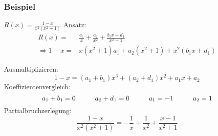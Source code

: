 \subsubsection{Beispiel}
$R(x)=\frac{1-x}{x^2(x^2+1)}$
Ansatz: 
\begin{align*}
R(x)=&\frac{a_1}{x}+\frac{a_2}{x^2}+\frac{b_1x+d_1}{x^2+1}\\
\Rightarrow 1-x= &x(x^2+1)a_1+a_2(x^2+1)+x^2(b_1x+d_1)
\end{align*}

Ausmultiplizieren:
\[1-x=(a_1+b_1)x^3+(a_2+d_1)x^2+a_1x+a_2\]
Koeffizientenvergleich:
\[a_1+b_1=0\text{\hspace{10mm}}a_2+d_1=0\text{\hspace{10mm}}a_1=-1\text{\hspace{10mm}}a_2=1\]
Partialbruchzerlegung:
\[\frac{1-x}{x^2(x^2+1)}=-\frac{1}{x}+\frac{1}{x^2}+\frac{x-1}{x^2+1}\]
